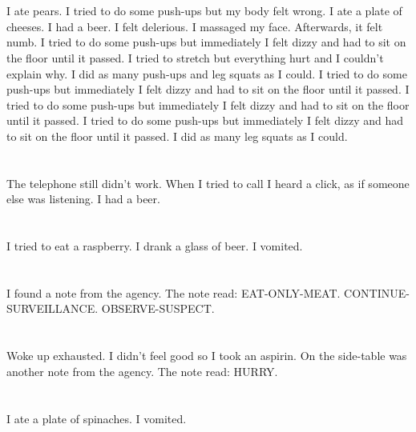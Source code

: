 \documentclass{article}
\begin{document}
    \section{}
    I ate pears. I tried to do some push-ups but my body felt wrong. I ate a plate of cheeses. I had a beer. I felt delerious.  I massaged my face. Afterwards, it felt numb.  I tried to do some push-ups but immediately I felt dizzy and had to sit on the floor until it passed.  I tried to stretch but everything hurt and I couldn't explain why.  I did as many push-ups and leg squats as I could.   I tried to do some push-ups but immediately I felt dizzy and had to sit on the floor until it passed.  I tried to do some push-ups but immediately I felt dizzy and had to sit on the floor until it passed.  I tried to do some push-ups but immediately I felt dizzy and had to sit on the floor until it passed.  I did as many leg squats as I could.  
    \newpage
    
    \section{}
    The telephone still didn't work. When I tried to call I heard a click, as if someone else was listening. I had a beer.  
    \newpage
    
    \section{}
    I tried to eat a raspberry. I drank a glass of beer. I vomited.  
    \newpage
    
    \section{}
    I found a note from the agency. The note read: EAT-ONLY-MEAT. CONTINUE-SURVEILLANCE. OBSERVE-SUSPECT.  
    \newpage
    
    \section{}
    Woke up exhausted. I didn't feel good so I took an aspirin. On the side-table was another note from the agency. The note read: HURRY.  
    \newpage
    
    \section{}
    I ate a plate of spinaches. I vomited.  
    \newpage
    
\end{document}
